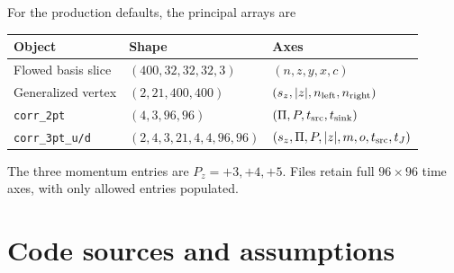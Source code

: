 \documentclass[11pt]{article}
\numberwithin{equation}{section}
\begin{document}
For the production defaults, the principal arrays are
\begin{center}
\begin{tabular}{p{}p{}p{}}
  \toprule
  Object & Shape & Axes \\
  \midrule
  Flowed basis slice
  & \((400,32,32,32,3)\)
  & \((n,z,y,x,c)\) \\
  Generalized vertex
  & \((2,21,400,400)\)
  & \((s_z,|z|,n_{\rm left},n_{\rm right})\) \\
  \texttt{corr\_2pt}
  & \((4,3,96,96)\)
  & \((\Pi,P,t_{\rm src},t_{\rm sink})\) \\
  \texttt{corr\_3pt\_u/d}
  & \((2,4,3,21,4,4,96,96)\)
  & \((s_z,\Pi,P,|z|,m,o,t_{\rm src},t_J)\) \\
  \bottomrule
\end{tabular}
\end{center}
The three momentum entries are \(P_z=+3,+4,+5\).  Files retain full
\(96\times96\) time axes, with only allowed entries populated.

\section{Code sources and assumptions}
\end{document}
